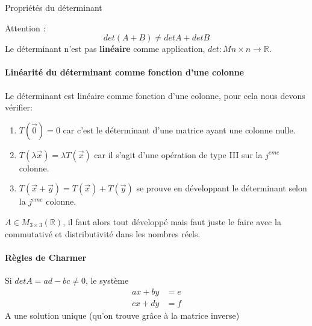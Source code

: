 \begin{parag}{Propriétés du déterminant}
\begin{framedremark}
    
        Attention : \[ det(A + B) \neq det A + det B\]
        Le déterminant n'est pas \textbf{linéaire} comme application, $det : M{n\times n} \to \mathbb{R}$.
    
    \end{framedremark}
\end{parag}

    \paragraph{Linéarité du déterminant comme fonction \textbf{d'une colonne}}
    Le déterminant est linéaire comme fonction d'une colonne, pour cela nous devons vérifier:
    \begin{enumerate}
        \item $T(\vec{0}) = 0$ car c'est le déterminant d'une matrice ayant une colonne nulle.
        \item $T(\lambda\vec{x}) = \lambda T(\vec{x})$ car il s'agit d'une opération de type III sur la $j^{eme}$ colonne.
        \item $T(\vec{x}+ \vec{y}) = T(\vec{x}) + T(\vec{y})$ se prouve en développant le déterminant selon la $j^{eme}$ colonne.

    \end{enumerate}


    $A  \in M_{3\times3}(\mathbb{R})$, il faut alors tout développé mais faut juste le faire avec la commutativé et distributivité dans les nombres réels.

    \paragraph{Règles de Charmer}
    \begin{theoreme}
        
    
    Si $det A = ad-bc \neq 0$, le système
    \begin{align*}
        ax + by &= e\\
        cx + dy &= f
    \end{align*}
    A une solution unique (qu'on trouve grâce à la matrice inverse)
    \end{theoreme}
    \\
    
